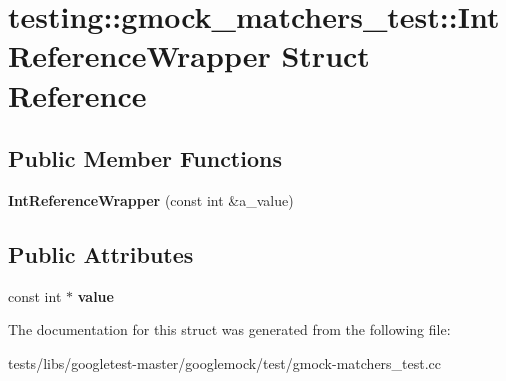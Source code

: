 \hypertarget{structtesting_1_1gmock__matchers__test_1_1IntReferenceWrapper}{}\section{testing\+:\+:gmock\+\_\+matchers\+\_\+test\+:\+:Int\+Reference\+Wrapper Struct Reference}
\label{structtesting_1_1gmock__matchers__test_1_1IntReferenceWrapper}
\subsection*{Public Member Functions}
\begin{DoxyCompactItemize}
\item 
\mbox{\label{structtesting_1_1gmock__matchers__test_1_1IntReferenceWrapper_a9094df655096520977e13d620fbf7be7}} 
{\bfseries Int\+Reference\+Wrapper} (const int \&a\+\_\+value)
\end{DoxyCompactItemize}
\subsection*{Public Attributes}
\begin{DoxyCompactItemize}
\item 
\mbox{\label{structtesting_1_1gmock__matchers__test_1_1IntReferenceWrapper_ac8fcb05733aa1fdb6c5236731b236cf6}} 
const int $\ast$ {\bfseries value}
\end{DoxyCompactItemize}


The documentation for this struct was generated from the following file\+:\begin{DoxyCompactItemize}
\item 
tests/libs/googletest-\/master/googlemock/test/gmock-\/matchers\+\_\+test.\+cc\end{DoxyCompactItemize}
